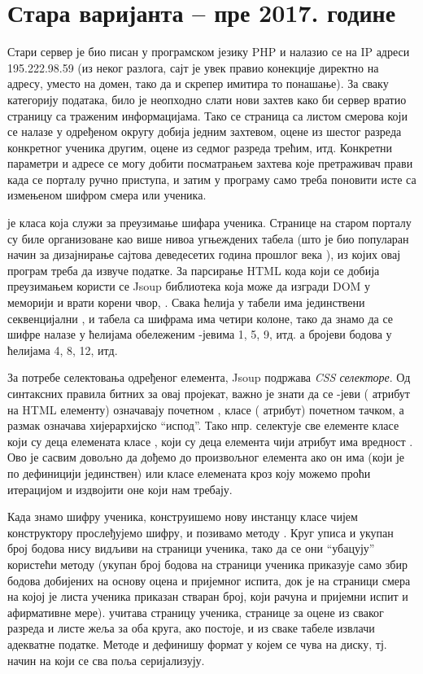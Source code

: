 \section{Стара варијанта -- пре 2017. године}

Стари сервер је био писан у програмском језику PHP и налазио се на IP адреси 195.222.98.59 (из неког разлога, сајт је увек правио конекције директно на адресу, уместо на домен, тако да и скрепер имитира то понашање). За сваку категорију података, било је неопходно слати нови захтев како би сервер вратио страницу са траженим информацијама. Тако се страница са листом смерова који се налазе у одређеном округу добија једним захтевом, оцене из шестог разреда конкретног ученика другим, оцене из седмог разреда трећим, итд. Конкретни параметри и адресе се могу добити посматрањем захтева које претраживач прави када се порталу ручно приступа, и затим у програму само треба поновити исте са измењеном шифром смера или ученика.

 је класа која служи за преузимање шифара ученика. Странице на старом порталу су биле организоване као више нивоа угњеждених табела (што је био популаран начин за дизајнирање сајтова деведесетих година прошлог века \citep{htmltables}), из којих овај програм треба да извуче податке. За парсирање HTML кода који се добија преузимањем користи се Jsoup библиотека која може да изгради DOM у меморији и врати корени чвор, . Свака ћелија у табели има јединствени секвенцијални , и табела са шифрама има четири колоне, тако да знамо да се шифре налазе у ћелијама обележеним -јевима 1, 5, 9, итд. а бројеви бодова у ћелијама 4, 8, 12, итд.

За потребе селектовања одређеног елемента, Jsoup подржава \emph{CSS селекторе}. Од синтаксних правила битних за овај пројекат, важно је знати да се -јеви ( атрибут на HTML елементу) означавају почетном \code{\#}, класе ( атрибут) почетном тачком, а размак означава хијерархијско \enquote{испод}. Тако нпр.  селектује све елементе класе  који су деца елемената класе , који су деца елемента чији  атрибут има вредност . Ово је сасвим довољно да дођемо до произвољног елемента ако он има  (који је по дефиницији јединствен) или класе елемената кроз коју можемо проћи итерацијом и издвојити оне који нам требају.

Када знамо шифру ученика, конструишемо нову инстанцу класе  чијем конструктору прослеђујемо шифру, и позивамо методу . Круг уписа и укупан број бодова нису видљиви на страници ученика, тако да се они \enquote{убацују} користећи  методу (укупан број бодова на страници ученика приказује само збир бодова добијених на основу оцена и пријемног испита, док је на страници смера на којој је листа ученика приказан стваран број, који рачуна и пријемни испит и афирмативне мере).  учитава страницу ученика, странице за оцене из сваког разреда и листе жеља за оба круга, ако постоје, и из сваке табеле извлачи адекватне податке. Методе  и  дефинишу формат у којем се  чува на диску, тј. начин на који се сва поља серијализују.

